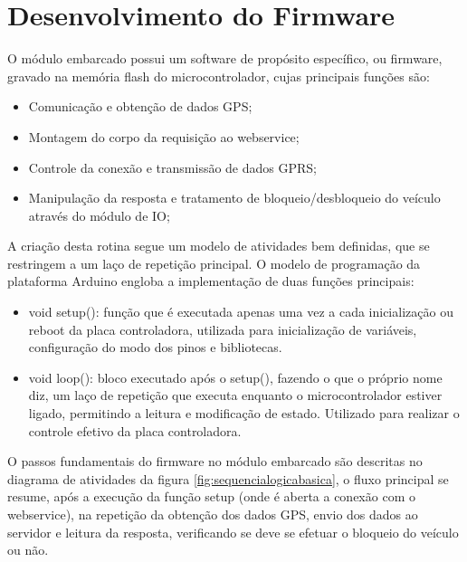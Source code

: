 \section {Desenvolvimento do Firmware}

O módulo embarcado possui um software de propósito específico, ou firmware, gravado na memória flash do microcontrolador, cujas principais funções são:

\begin{itemize}
	\item Comunicação e obtenção de dados GPS;
	\item Montagem do corpo da requisição ao webservice;
	\item Controle da conexão e transmissão de dados GPRS;
	\item Manipulação da resposta e tratamento de bloqueio/desbloqueio do veículo através do módulo de IO;
\end{itemize}

A criação desta rotina segue um modelo de atividades bem definidas, que se restringem a um laço de repetição principal. O modelo de programação da plataforma Arduino engloba a implementação de duas funções principais:

\begin{itemize}
	\item void setup(): função que é executada apenas uma vez a cada inicialização ou reboot da placa controladora, utilizada para inicialização de variáveis, configuração do modo dos pinos e bibliotecas.
	\item void loop(): bloco executado após o setup(), fazendo o que o próprio nome diz, um laço de repetição que executa enquanto o microcontrolador estiver ligado, permitindo a leitura e modificação de estado. Utilizado para realizar o controle efetivo da placa controladora.
\end{itemize} 

O passos fundamentais do firmware no módulo embarcado são descritas no diagrama de atividades da figura \ref{fig:sequencialogicabasica}, o fluxo principal se resume, após a execução da função setup (onde é aberta a conexão com o webservice), na repetição da obtenção dos dados GPS, envio dos dados ao servidor e leitura da resposta, verificando se deve se efetuar o bloqueio do veículo ou não.


